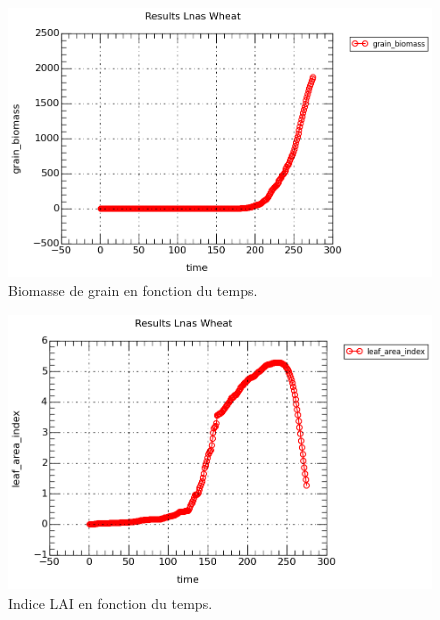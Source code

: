 \begin{figure}[H]

\begin{center}
 \includegraphics[scale = 0.67]{./img/grain.png}
 \caption{Biomasse de grain en fonction du temps.}
 \label{fig:resultatGrain}
\end{center}

\end{figure}

\begin{figure}[H]

\begin{center}
 \includegraphics[scale = 0.67]{./img/LAI.png}
 \caption{Indice LAI en fonction du temps.}
 \label{fig:resultatLAI}
\end{center}

\end{figure}

